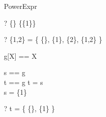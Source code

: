 \begin{zsection}
  \SECTION PowerExpr
\end{zsection}

\begin{zed} \vdash? \power \{\} \in \power \{\{1\}\} \end{zed}
\begin{zed} \vdash? \power \{1,2\} = \{ \{\}, \{1\}, \{2\}, \{1,2\} \} \end{zed}

\begin{zed}
  g[X] == X
\end{zed}

\begin{axdef}
  s == g\\
  t == g
\where
  t = \power s\\
  s = \{1\}
\end{axdef}

\begin{zed} \vdash? t = \{ \{\}, \{1\} \} \end{zed}
